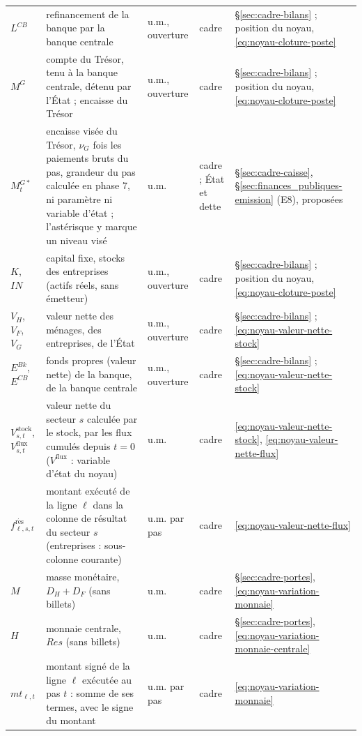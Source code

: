 \documentclass[11pt,a4paper]{article}
\begin{document}
\begin{center}
\begin{longtable}{>{\raggedright\arraybackslash}p{1.6cm}>{\raggedright\arraybackslash}p{5.6cm}>{\raggedright\arraybackslash}p{2.0cm}>{\raggedright\arraybackslash}p{2.2cm}>{\raggedright\arraybackslash}p{2.8cm}}
$L^{\mathit{CB}}$ & refinancement de la banque par la banque centrale & u.m., ouverture & cadre & \S\ref{sec:cadre-bilans} ; position du noyau, \eqref{eq:noyau-cloture-poste}\\
$M^G$ & compte du Trésor, tenu à la banque centrale, détenu par l'État ; encaisse du Trésor & u.m., ouverture & cadre & \S\ref{sec:cadre-bilans} ; position du noyau, \eqref{eq:noyau-cloture-poste}\\
$M^{G*}_t$ & encaisse visée du Trésor, $\nu_G$ fois les paiements bruts du pas, grandeur du pas calculée en phase 7, ni paramètre ni variable d'état ; l'astérisque y marque un niveau visé & u.m. & cadre ; État et dette & \S\ref{sec:cadre-caisse}, \S\ref{sec:finances_publiques-emission} (E8), proposées\\
$K$, $\mathit{IN}$ & capital fixe, stocks des entreprises (actifs réels, sans émetteur) & u.m., ouverture & cadre & \S\ref{sec:cadre-bilans} ; position du noyau, \eqref{eq:noyau-cloture-poste}\\
$V_H$, $V_F$, $V_G$ & valeur nette des ménages, des entreprises, de l'État & u.m., ouverture & cadre & \S\ref{sec:cadre-bilans} ; \eqref{eq:noyau-valeur-nette-stock}\\
$E^{\mathit{Bk}}$, $E^{\mathit{CB}}$ & fonds propres (valeur nette) de la banque, de la banque centrale & u.m., ouverture & cadre & \S\ref{sec:cadre-bilans} ; \eqref{eq:noyau-valeur-nette-stock}\\
$V^{\mathrm{stock}}_{s,t}$, $V^{\mathrm{flux}}_{s,t}$ & valeur nette du secteur $s$ calculée par le stock, par les flux cumulés depuis $t = 0$ ($V^{\mathrm{flux}}$ : variable d'état du noyau) & u.m. & cadre & \eqref{eq:noyau-valeur-nette-stock}, \eqref{eq:noyau-valeur-nette-flux}\\
$f^{\mathrm{r\acute{e}s}}_{\ell,s,t}$ & montant exécuté de la ligne $\ell$ dans la colonne de résultat du secteur $s$ (entreprises : sous-colonne courante) & u.m. par pas & cadre & \eqref{eq:noyau-valeur-nette-flux}\\
$M$ & masse monétaire, $D_H + D_F$ (sans billets) & u.m. & cadre & \S\ref{sec:cadre-portes}, \eqref{eq:noyau-variation-monnaie}\\
$H$ & monnaie centrale, $\mathit{Res}$ (sans billets) & u.m. & cadre & \S\ref{sec:cadre-portes}, \eqref{eq:noyau-variation-monnaie-centrale}\\
$\mathit{mt}_{\ell,t}$ & montant signé de la ligne $\ell$ exécutée au pas $t$ : somme de ses termes, avec le signe du montant & u.m. par pas & cadre & \eqref{eq:noyau-variation-monnaie}\\

\end{longtable}
\end{center}
\end{document}
